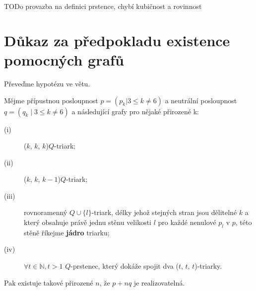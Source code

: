 TODo provazba na definici prstence, chybí kubičnost a rovinnost



\section{Důkaz za předpokladu existence pomocných grafů}
Převeďme hypotézu ve větu.

\begin{veta}\label{veta02:2}
Mějme přípustnou posloupnost $p=(p_k | 3 \leq k \neq 6)$ a neutrální posloupnost $q=(q_k \mid 3 \leq k \neq 6)$ a následující grafy pro nějaké přirozené k:
\begin{description}
\item[(i)] ($k$, $k$, $k$)$Q$-triark;
\item[(ii)] ($k$, $k$, $k-1$)$Q$-triark;
\item[(iii)] rovnoramenný $Q\cup \lbrace l \rbrace$-triark, délky jehož stejných stran jsou dělitelné $k$ a který obsahuje právě jednu stěnu velikosti $l$ pro každé nenulové $p_l$ v $p$, této stěně říkejme \textbf{jádro} triarku;
\item[(iv)] $\forall t \in \mathbb{N}, t>1$ $Q$-prstenec, který dokáže spojit dva ($t$, $t$, $t$)-triarky.
\end{description} 

Pak existuje takové přirozené $n$, že $p+nq$ je realizovatelná.
\end{veta}


